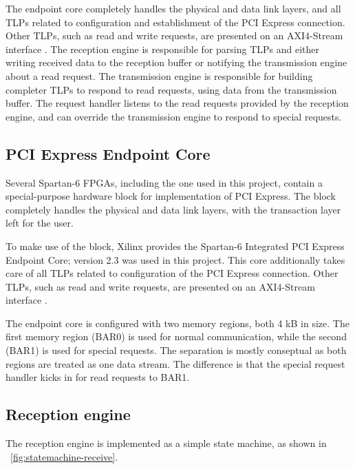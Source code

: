 The endpoint core completely handles the physical and data link layers, and all TLPs related to configuration and establishment of the PCI Express connection.
Other TLPs, such as read and write requests, are presented on an AXI4-Stream interface \cite{ug672}.
The reception engine is responsible for parsing TLPs and either writing received data to the reception buffer or notifying the transmission engine about a read request.
The transmission engine is responsible for building completer TLPs to respond to read requests, using data from the transmission buffer.
The request handler listens to the read requests provided by the reception engine, and can override the transmission engine to respond to special requests.

\subsection{PCI Express Endpoint Core}

Several Spartan-6 FPGAs, including the one used in this project, contain a special-purpose hardware block for implementation of PCI Express.
The block completely handles the physical and data link layers, with the transaction layer left for the user.

To make use of the block, Xilinx provides the Spartan-6 Integrated PCI Express Endpoint Core; version 2.3 was used in this project.
This core additionally takes care of all TLPs related to configuration of the PCI Express connection.
Other TLPs, such as read and write requests, are presented on an AXI4-Stream interface \cite{ug672}.

The endpoint core is configured with two memory regions, both 4 kB in size\footnotemark.
The first memory region (BAR0) is used for normal communication, while the second (BAR1) is used for special requests.
The separation is mostly conseptual as both regions are treated as one data stream.
The difference is that the special request handler kicks in for read requests to BAR1.

\subsection{Reception engine}

The reception engine is implemented as a simple state machine, as shown in \figurename~\ref{fig:statemachine-receive}.

